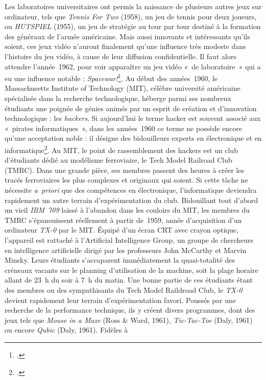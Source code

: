 \documentclass{FramateX}
\begin{document}
\begin{refsection}
Les laboratoires universitaires ont permis la naissance de plusieurs
autres jeux sur ordinateur, tels que
\textit{Tennis For Two} (1958), un jeu de
tennis pour deux joueurs, ou \textit{HUTSPIEL} (1955), un jeu de stratégie au tour par tour destiné à la formation
des généraux de l'armée américaine. Mais aussi innovants et
intéressants qu'ils soient, ces jeux vidéo n'auront finalement qu'une
influence très modeste dans l'histoire du jeu vidéo, à cause de leur
diffusion confidentielle. Il faut alors attendre l'année~1962, pour
voir apparaître un jeu vidéo «~de laboratoire~» qui a eu une influence
notable : \textit{Spacewar!}\footnote{\cite{djaoutiles2010-1}.}. Au début des années~1960, le
Massachusetts Institute of
Technology (MIT), célèbre université américaine spécialisée dans la
recherche technologique, héberge parmi ses nombreux étudiants une
poignée de génies animés par un esprit de création et d'innovation
technologique : les \textit{hackers}. Si
aujourd'hui le terme hacker est souvent associé aux «~pirates
informatiques~», dans les années~1960 ce terme ne possède encore qu'une
acceptation noble : il désigne des bidouilleurs experts en électronique
et en informatique\footnote{\cite{levyhackers1994}.}. Au MIT, le point de rassemblement des
hackers est un club d'étudiants dédié au modélisme ferroviaire, le Tech
Model Railroad Club (TMRC). Dans une grande pièce, ses membres passent
des heures à créer les tracés ferroviaires les plus complexes et
originaux qui soient. Si cette tâche ne nécessite \textit{a~priori} que
des compétences en électronique, l'informatique deviendra rapidement un
autre terrain d'expérimentation du club. Bidouillant tout d'abord un
vieil \textit{IBM~709} laissé à l'abandon
dans les couloirs du MIT, les membres du TMRC s'épanouissent réellement
à partir de~1959, année d'acquisition d'un ordinateur
\textit{TX-0} par le MIT. Équipé d'un écran
CRT avec crayon optique, l'appareil est rattaché à l'Artificial
Intelligence Group, un groupe de chercheurs en intelligence
artificielle dirigé par les professeurs John McCarthy et Marvin Minsky.
Leurs étudiants s'accaparent immédiatement la quasi-totalité des
créneaux vacants sur le planning d'utilisation de la machine, soit la
plage horaire allant de 23~h du soir à 7~h du matin. Une bonne partie
de ces étudiants étant des membres ou des sympathisants du Tech Model
Raildroad Club, le \textit{TX-0} devient
rapidement leur terrain d'expérimentation favori. Poussés par une
recherche de la performance technique, ils y créent divers programmes,
dont des jeux tels que \textit{Mouse in a Maze} (Ross \& Ward, 1961), \textit{Tic-Tac-Toe} (Daly, 1961) ou encore \textit{Qubic} (Daly, 1961). Fidèles à

\end{refsection}
\end{document}
